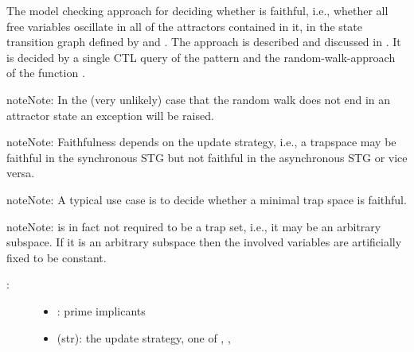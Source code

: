 \documentclass[letterpaper,10pt,english]{sphinxmanual}
\begin{document}
\begin{fulllineitems}
\label{\detokenize{AttractorDetection:PyBoolNet.AttractorDetection.faithfulness}}
The model checking approach for deciding whether  is faithful,
i.e., whether all free variables oscillate in all of the attractors contained in it,
in the state transition graph defined by  and .
The approach is described and discussed in {\hyperref[\detokenize{Bibliography:klarner2015trap}]{}}.
It is decided by a single CTL query of the pattern 
and the random-walk-approach of the function {\hyperref[\detokenize{StateTransitionGraphs:random-walk}]{}}.

\begin{sphinxadmonition}{note}{Note:}
In the (very unlikely) case that the random walk does not end in an attractor state an exception will be raised.
\end{sphinxadmonition}

\begin{sphinxadmonition}{note}{Note:}
Faithfulness depends on the update strategy, i.e.,
a trapspace may be faithful in the synchronous STG but not faithful in the asynchronous STG or vice versa.
\end{sphinxadmonition}

\begin{sphinxadmonition}{note}{Note:}
A typical use case is to decide whether a minimal trap space is faithful.
\end{sphinxadmonition}

\begin{sphinxadmonition}{note}{Note:}
 is in fact not required to be a trap set, i.e., it may be an arbitrary subspace.
If it is an arbitrary subspace then the involved variables are artificially fixed to be constant.
\end{sphinxadmonition}
\begin{description}
\item[{:}] \leavevmode\begin{itemize}
\item {} 
: prime implicants

\item {} 
 (str): the update strategy, one of , , 


\end{itemize}
\end{description}
\end{fulllineitems}
\end{document}
